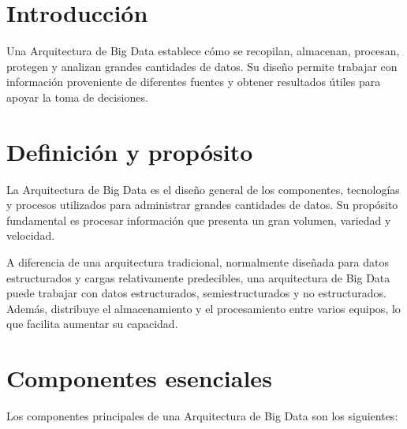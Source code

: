 
\section{Introducción}

Una Arquitectura de Big Data establece cómo se recopilan, almacenan,
procesan, protegen y analizan grandes cantidades de datos. Su diseño permite
trabajar con información proveniente de diferentes fuentes y obtener
resultados útiles para apoyar la toma de decisiones.

\section{Definición y propósito}

La Arquitectura de Big Data es el diseño general de los componentes,
tecnologías y procesos utilizados para administrar grandes cantidades de
datos. Su propósito fundamental es procesar información que presenta un gran
volumen, variedad y velocidad.

A diferencia de una arquitectura tradicional, normalmente diseñada para datos
estructurados y cargas relativamente predecibles, una arquitectura de Big
Data puede trabajar con datos estructurados, semiestructurados y no
estructurados. Además, distribuye el almacenamiento y el procesamiento entre
varios equipos, lo que facilita aumentar su capacidad.

\section{Componentes esenciales}

Los componentes principales de una Arquitectura de Big Data son los
siguientes:

